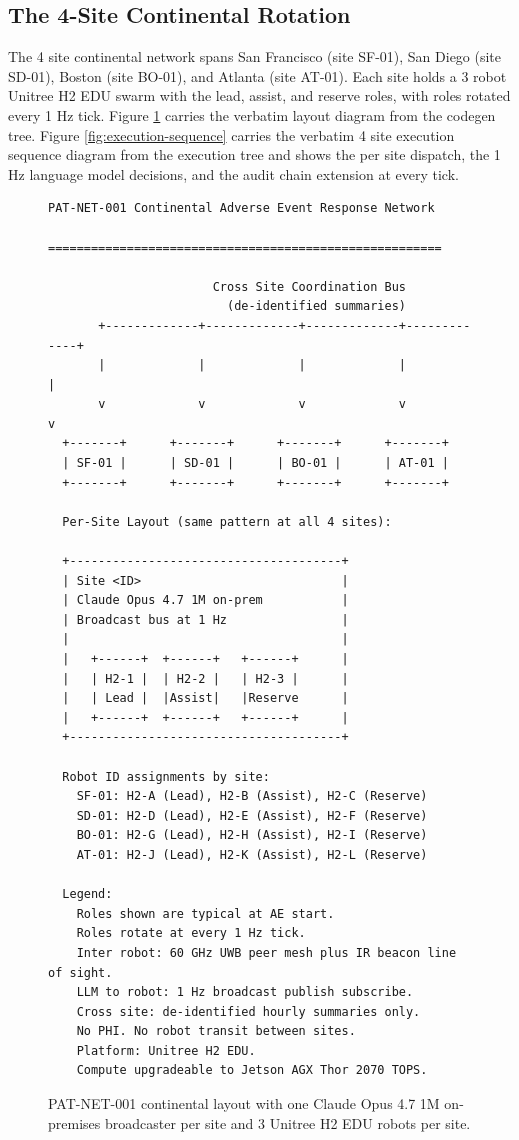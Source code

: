 \begin{sectionaccent}
\subsection{The 4-Site Continental Rotation}
\label{sec:intro-rotation}

The 4 site continental network spans San Francisco (site SF-01), San
Diego (site SD-01), Boston (site BO-01), and Atlanta (site AT-01).
Each site holds a 3 robot Unitree H2 EDU swarm with the lead, assist,
and reserve roles, with roles rotated every 1 Hz tick. Figure
\ref{fig:network-layout} carries the verbatim layout diagram from
the codegen tree. Figure \ref{fig:execution-sequence} carries the
verbatim 4 site execution sequence diagram from the execution tree
and shows the per site dispatch, the 1 Hz language model decisions,
and the audit chain extension at every tick.

\begin{figure}[H]
\centering
\begin{Verbatim}[fontsize=\footnotesize]
           PAT-NET-001 Continental Adverse Event Response Network
           =======================================================

                       Cross Site Coordination Bus
                         (de-identified summaries)
       +-------------+-------------+-------------+-------------+
       |             |             |             |             |
       v             v             v             v             v
  +-------+      +-------+      +-------+      +-------+
  | SF-01 |      | SD-01 |      | BO-01 |      | AT-01 |
  +-------+      +-------+      +-------+      +-------+

  Per-Site Layout (same pattern at all 4 sites):

  +--------------------------------------+
  | Site <ID>                            |
  | Claude Opus 4.7 1M on-prem           |
  | Broadcast bus at 1 Hz                |
  |                                      |
  |   +------+  +------+   +------+      |
  |   | H2-1 |  | H2-2 |   | H2-3 |      |
  |   | Lead |  |Assist|   |Reserve      |
  |   +------+  +------+   +------+      |
  +--------------------------------------+

  Robot ID assignments by site:
    SF-01: H2-A (Lead), H2-B (Assist), H2-C (Reserve)
    SD-01: H2-D (Lead), H2-E (Assist), H2-F (Reserve)
    BO-01: H2-G (Lead), H2-H (Assist), H2-I (Reserve)
    AT-01: H2-J (Lead), H2-K (Assist), H2-L (Reserve)

  Legend:
    Roles shown are typical at AE start.
    Roles rotate at every 1 Hz tick.
    Inter robot: 60 GHz UWB peer mesh plus IR beacon line of sight.
    LLM to robot: 1 Hz broadcast publish subscribe.
    Cross site: de-identified hourly summaries only.
    No PHI. No robot transit between sites.
    Platform: Unitree H2 EDU.
    Compute upgradeable to Jetson AGX Thor 2070 TOPS.
\end{Verbatim}
\caption{PAT-NET-001 continental layout with one Claude Opus 4.7 1M on-premises broadcaster per site and 3 Unitree H2 EDU robots per site.}
\label{fig:network-layout}
\end{figure}


\end{sectionaccent}

